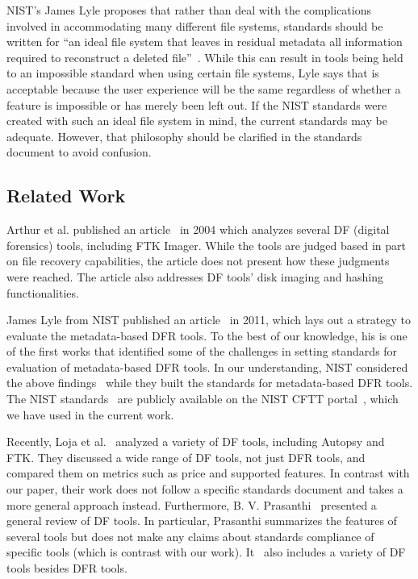 NIST's James Lyle proposes that rather than deal with the complications involved in accommodating 
many different file systems, standards should be written for ``an ideal file system that leaves in 
residual metadata  all  information  required  to  reconstruct  a  deleted  file''~\cite{lyle2011-ICDF2C}. 
While this can result in tools being held to an impossible standard when using certain file systems, 
Lyle says that is acceptable because the user experience will be the same regardless of whether a feature is impossible or has merely been left out.
If the NIST standards were created with such an ideal file system in mind, the current standards may be adequate.
However, that philosophy should be clarified in the standards document to avoid confusion.


\subsection{Related Work} \label{sec:discussion:subsec:related}

Arthur et al. published an article~\cite{arthur2004} in 2004 which analyzes several DF (digital forensics) tools, including FTK Imager.
While the tools are judged based in part on file recovery capabilities, the article does not present how these judgments were reached.
The article also addresses DF tools' disk imaging and hashing functionalities.

James Lyle from NIST published an article~\cite{lyle2011-ICDF2C} in 2011, which lays out a strategy to evaluate the metadata-based DFR tools. To the best of our knowledge, 
his is one of the first works that identified some of the challenges in setting standards for evaluation of metadata-based DFR tools.
In our understanding, NIST considered the above findings~\cite{lyle2011-ICDF2C} while they built the standards for metadata-based DFR tools.  
The NIST standards~\cite{meta:dfr:standards} are publicly available on the NIST CFTT portal~\cite{cftt:nist}, which we have used in the current work.

Recently, Loja et al.~\cite{loja2016} analyzed a variety of DF tools, including Autopsy and FTK. 
They discussed a wide range of DF tools, not just DFR tools, and compared them on metrics such as price and supported features. 
In contrast with our paper, their work does not follow a specific standards document and takes a more general approach instead.
Furthermore, B. V. Prasanthi~\cite{prasanthi2016} presented a general review of DF tools. 
In particular, Prasanthi summarizes the features of several tools but does not make any claims about standards compliance of specific tools (which is contrast with our work).
It~\cite{prasanthi2016} also includes a variety of DF tools besides DFR tools.



